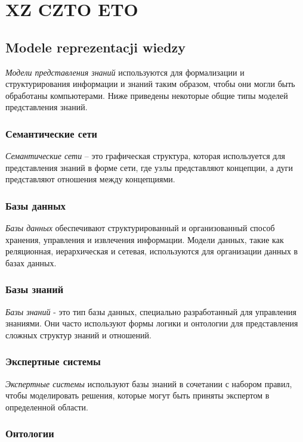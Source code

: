 \chapter{XZ CZTO ETO}
\section{Modele reprezentacji wiedzy}

\textit{Модели представления знаний} используются для формализации и структурирования информации и знаний таким образом, чтобы они могли быть обработаны компьютерами. Ниже приведены некоторые общие типы моделей представления знаний.

\subsection{Семантические сети}

\textit{Семантические сети} – это графическая структура, которая используется для представления знаний в форме сети, где узлы представляют концепции, а дуги представляют отношения между концепциями.

\subsection{Базы данных}

\textit{Базы данных} обеспечивают структурированный и организованный способ хранения, управления и извлечения информации. Модели данных, такие как реляционная, иерархическая и сетевая, используются для организации данных в базах данных.

\subsection{Базы знаний}

\textit{Базы знаний} - это тип базы данных, специально разработанный для управления знаниями. Они часто используют формы логики и онтологии для представления сложных структур знаний и отношений.

\subsection{Экспертные системы}

\textit{Экспертные системы} используют базы знаний в сочетании с набором правил, чтобы моделировать решения, которые могут быть приняты экспертом в определенной области.

\subsection{Онтологии}


